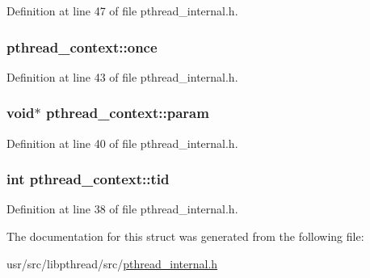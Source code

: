 Definition at line 47 of file pthread\+\_\+internal.\+h.

\hypertarget{structpthread__context_a33f7f059b1d0cda2a8675d13600b6dd2}{
\subsubsection[{once}]{ pthread\+\_\+context\+::once}}\label{structpthread__context_a33f7f059b1d0cda2a8675d13600b6dd2}


Definition at line 43 of file pthread\+\_\+internal.\+h.

\hypertarget{structpthread__context_afb0244aa84b0403cc0df2cd6ebdb94b4}{
\subsubsection[{param}]{\setlength{\rightskip}{0pt plus 5cm}void$\ast$ pthread\+\_\+context\+::param}}\label{structpthread__context_afb0244aa84b0403cc0df2cd6ebdb94b4}


Definition at line 40 of file pthread\+\_\+internal.\+h.

\hypertarget{structpthread__context_a5b7aa396dbf3c140b1a54f09568c8253}{
\subsubsection[{tid}]{\setlength{\rightskip}{0pt plus 5cm}int pthread\+\_\+context\+::tid}}\label{structpthread__context_a5b7aa396dbf3c140b1a54f09568c8253}


Definition at line 38 of file pthread\+\_\+internal.\+h.



The documentation for this struct was generated from the following file\+:\begin{DoxyCompactItemize}
\item 
usr/src/libpthread/src/\hyperlink{pthread__internal_8h}{pthread\+\_\+internal.\+h}\end{DoxyCompactItemize}
